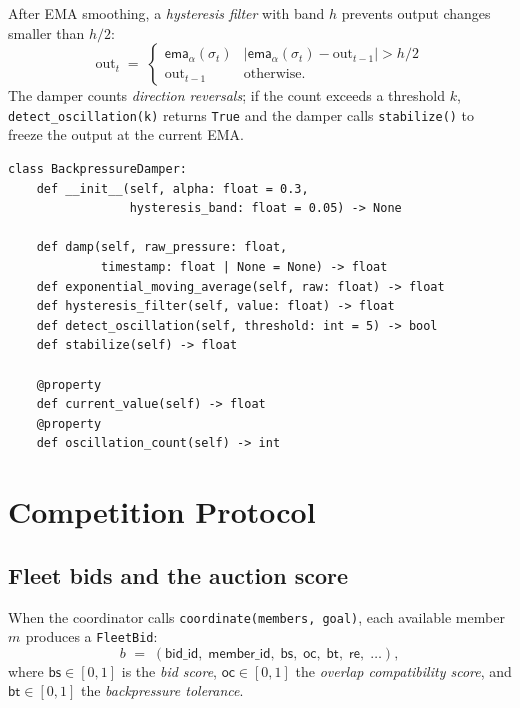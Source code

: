 \documentclass[11pt]{article}
\providecommand{\member}[1]{m_{#1}}                %
\providecommand{\bid}[1]{b_{#1}}                   %
\providecommand{\instab}{\sigma}                   %
\providecommand{\ema}{\mathsf{ema}}                %
\providecommand{\FleetBidPY}{\texttt{FleetBid}}
\providecommand{\DamperPY}{\texttt{BackpressureDamper}}
\begin{document}
After EMA smoothing, a \emph{hysteresis filter} with band $h$ prevents
output changes smaller than $h/2$:
\[
  \text{out}_{t}
  \;=\;
  \begin{cases}
    \ema_\alpha(\instab_t) & |\ema_\alpha(\instab_t) - \text{out}_{t-1}| > h/2 \\
    \text{out}_{t-1}       & \text{otherwise.}
  \end{cases}
\]
The damper counts \emph{direction reversals}; if the count exceeds a
threshold $k$, \texttt{detect\_oscillation(k)} returns \texttt{True} and
the damper calls \texttt{stabilize()} to freeze the output at the current EMA.

\begin{lstlisting}[style=jugeo-python, caption={\DamperPY{} interface.}]
class BackpressureDamper:
    def __init__(self, alpha: float = 0.3,
                 hysteresis_band: float = 0.05) -> None

    def damp(self, raw_pressure: float,
             timestamp: float | None = None) -> float
    def exponential_moving_average(self, raw: float) -> float
    def hysteresis_filter(self, value: float) -> float
    def detect_oscillation(self, threshold: int = 5) -> bool
    def stabilize(self) -> float

    @property
    def current_value(self) -> float
    @property
    def oscillation_count(self) -> int
\end{lstlisting}

\section{Competition Protocol}\label{sec:competition}

\subsection{Fleet bids and the auction score}

When the coordinator calls \texttt{coordinate(members, goal)}, each
available member $\member{}$ produces a \FleetBidPY{}:
\[
  \bid{} \;=\; (\mathsf{bid\_id},\; \mathsf{member\_id},\;
                \mathsf{bs},\; \mathsf{oc},\; \mathsf{bt},\;
                \mathsf{re},\; \ldots),
\]
where $\mathsf{bs} \in [0,1]$ is the \emph{bid score}, $\mathsf{oc} \in [0,1]$
the \emph{overlap compatibility score}, and $\mathsf{bt} \in [0,1]$ the
\emph{backpressure tolerance}.
\end{document}
